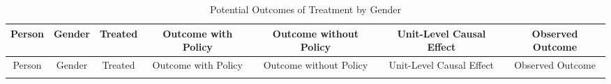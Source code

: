 \documentclass[]{book}
\begin{document}
\begin{longtable}[]{@{}ccccccc@{}}
\caption{\label{tab:atecalc} Potential Outcomes of Treatment by Gender}\tabularnewline
\toprule
\begin{minipage}[b]{0.08\columnwidth}\centering
Person\strut
\end{minipage} & \begin{minipage}[b]{0.08\columnwidth}\centering
Gender\strut
\end{minipage} & \begin{minipage}[b]{0.09\columnwidth}\centering
Treated\strut
\end{minipage} & \begin{minipage}[b]{0.13\columnwidth}\centering
Outcome
with Policy\strut
\end{minipage} & \begin{minipage}[b]{0.16\columnwidth}\centering
Outcome
without Policy\strut
\end{minipage} & \begin{minipage}[b]{0.15\columnwidth}\centering
Unit-Level
Causal Effect\strut
\end{minipage} & \begin{minipage}[b]{0.10\columnwidth}\centering
Observed
Outcome\strut
\end{minipage}\tabularnewline
\midrule
\endfirsthead
\toprule
\begin{minipage}[b]{0.08\columnwidth}\centering
Person\strut
\end{minipage} & \begin{minipage}[b]{0.08\columnwidth}\centering
Gender\strut
\end{minipage} & \begin{minipage}[b]{0.09\columnwidth}\centering
Treated\strut
\end{minipage} & \begin{minipage}[b]{0.13\columnwidth}\centering
Outcome
with Policy\strut
\end{minipage} & \begin{minipage}[b]{0.16\columnwidth}\centering
Outcome
without Policy\strut
\end{minipage} & \begin{minipage}[b]{0.15\columnwidth}\centering
Unit-Level
Causal Effect\strut
\end{minipage} & \begin{minipage}[b]{0.10\columnwidth}\centering
Observed
Outcome\strut
\end{minipage}\tabularnewline
\midrule
\endhead
\begin{minipage}[t]{0.08\columnwidth}\centering

\end{minipage}
\end{longtable}
\end{document}

